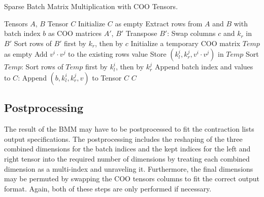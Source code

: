\begin{algorithm}[H]
    \caption{Sparse Batch Matrix Multiplication with COO Tensors.}
    \label{alg:bmm}
    \begin{algorithmic}[1]
        \REQUIRE Tensors $A$, $B$
        \ENSURE Tensor $C$
        \STATE Initialize $C$ as empty
        \STATE Extract rows from $A$ and $B$ with batch index $b$ as COO matrices $A'$, $B'$
        \STATE Transpose $B'$:
        \STATE Swap columns $c$ and $k_r$ in $B'$
        \STATE Sort rows of $B'$ first by $k_r$, then by $c$
        \STATE Initialize a temporary COO matrix $Temp$ as empty
        \STATE Add $v^i \cdot v^j$ to the existing rows value
        \ELSE
        \STATE Store $(k_l^i, k_r^j, v^i \cdot v^j)$ in $Temp$
        \ENDIF
        \ENDFOR
        \ENDFOR
        \STATE Sort $Temp$:
        \STATE Sort rows of $Temp$ first by $k_l^i$, then by $k_r^j$
        \STATE Append batch index and values to $C$:
        \STATE Append $(b, k_l^i, k_r^j, v)$ to Tensor $C$
        \ENDFOR
        \ENDFOR
        \RETURN $C$
    \end{algorithmic}
\end{algorithm}

\subsection{Postprocessing}
The result of the BMM may have to be postprocessed to fit the contraction lists output
specifications. The postprocessing includes the reshaping of the three combined dimensions for
the batch indices and the kept indices for the left and right tensor into the required number of dimensions by treating
each combined dimension as a multi-index and unraveling it. Furthermore, the final dimensions
may be permuted by swapping the COO tensors columns to fit the correct output format. Again,
both of these steps are only performed if necessary.

